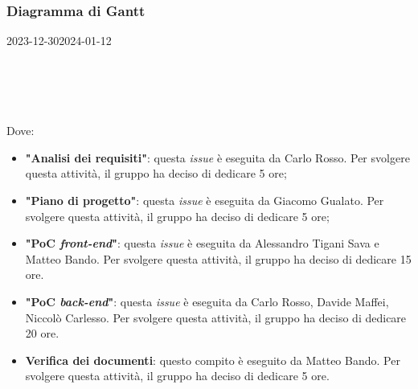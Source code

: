 
\subsubsection{Diagramma di Gantt}

\begin{ganttchart}[
		x unit=0.6cm, %
		y unit chart=0.6cm,
		bar/.style={fill=blue!50},
		bar height=0.5,
		time slot format=isodate,
		time slot unit=day,
		vgrid,
		today=2024-01-8,
		today rule/.style={draw=red, ultra thick}
	]{2023-12-30}{2024-01-12}
	 \\
	 \\
	 \\
	 \\
	 \\
\end{ganttchart}

Dove:
\begin{itemize}
	\item \textbf{"Analisi dei requisiti"}: questa \textit{issue} è eseguita da
	      Carlo Rosso. Per svolgere questa attività, il gruppo ha deciso di
	      dedicare 5 ore;

	\item \textbf{"Piano di progetto"}: questa \textit{issue} è eseguita da
	      Giacomo Gualato. Per svolgere questa attività, il gruppo ha deciso
	      di dedicare 5 ore;

	\item \textbf{"PoC \textit{front-end}"}: questa \textit{issue} è eseguita
	      da Alessandro Tigani Sava e Matteo Bando. Per svolgere questa
	      attività, il gruppo ha deciso di dedicare 15 ore.

	\item \textbf{"PoC \textit{back-end}"}: questa \textit{issue} è eseguita
	      da Carlo Rosso, Davide Maffei, Niccolò Carlesso. Per svolgere questa
	      attività, il gruppo ha deciso di dedicare 20 ore.

	\item \textbf{Verifica dei documenti}: questo compito è eseguito da
	      Matteo Bando. Per svolgere questa attività, il gruppo ha deciso
	      di dedicare 5 ore.
\end{itemize}

